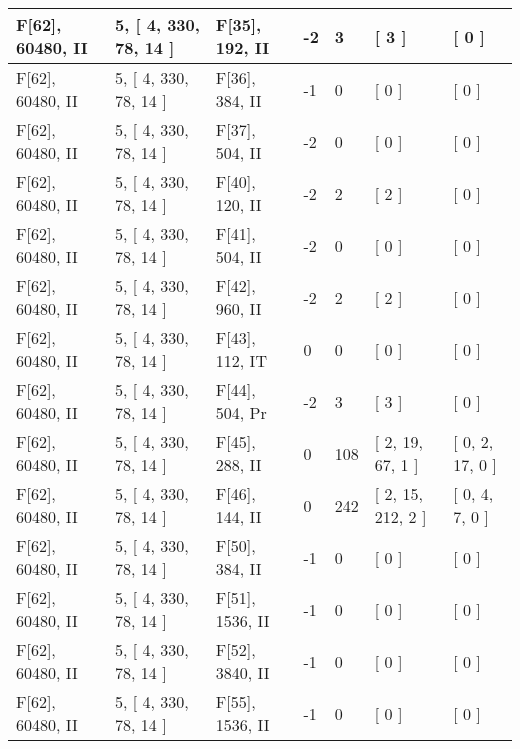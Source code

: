 \documentclass[9 pt]{scrartcl}
\begin{document}
\begin{longtable}{ |p{3em}|p{6em}|p{3em}|p{2em}|p{2em}|p{6em}|p{6em}| }
F[62], 60480, II &5, [ 4, 330, 78, 14 ] & F[35], 192, II  & -2 & 3 & [ 3 ] & [ 0 ]\\ \hline
F[62], 60480, II &5, [ 4, 330, 78, 14 ] & F[36], 384, II  & -1 & 0 & [ 0 ] & [ 0 ]\\ \hline
F[62], 60480, II &5, [ 4, 330, 78, 14 ] & F[37], 504, II  & -2 & 0 & [ 0 ] & [ 0 ]\\ \hline
F[62], 60480, II &5, [ 4, 330, 78, 14 ] & F[40], 120, II  & -2 & 2 & [ 2 ] & [ 0 ]\\ \hline
F[62], 60480, II &5, [ 4, 330, 78, 14 ] & F[41], 504, II  & -2 & 0 & [ 0 ] & [ 0 ]\\ \hline
F[62], 60480, II &5, [ 4, 330, 78, 14 ] & F[42], 960, II  & -2 & 2 & [ 2 ] & [ 0 ]\\ \hline
F[62], 60480, II &5, [ 4, 330, 78, 14 ] & F[43], 112, IT  & 0 & 0 & [ 0 ] & [ 0 ]\\ \hline
F[62], 60480, II &5, [ 4, 330, 78, 14 ] & F[44], 504, Pr  & -2 & 3 & [ 3 ] & [ 0 ]\\ \hline
F[62], 60480, II &5, [ 4, 330, 78, 14 ] & F[45], 288, II  & 0 & 108 & [ 2, 19, 67, 1 ] & [ 0, 2, 17, 0 ]\\ \hline
F[62], 60480, II &5, [ 4, 330, 78, 14 ] & F[46], 144, II  & 0 & 242 & [ 2, 15, 212, 2 ] & [ 0, 4, 7, 0 ]\\ \hline
F[62], 60480, II &5, [ 4, 330, 78, 14 ] & F[50], 384, II  & -1 & 0 & [ 0 ] & [ 0 ]\\ \hline
F[62], 60480, II &5, [ 4, 330, 78, 14 ] & F[51], 1536, II  & -1 & 0 & [ 0 ] & [ 0 ]\\ \hline
F[62], 60480, II &5, [ 4, 330, 78, 14 ] & F[52], 3840, II  & -1 & 0 & [ 0 ] & [ 0 ]\\ \hline
F[62], 60480, II &5, [ 4, 330, 78, 14 ] & F[55], 1536, II  & -1 & 0 & [ 0 ] & [ 0 ]\\ \hline
\end{longtable}
\end{document}
